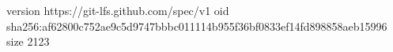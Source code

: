 version https://git-lfs.github.com/spec/v1
oid sha256:af62800c752ae9c5d9747bbbc011114b955f36bf0833ef14fd898858aeb15996
size 2123
